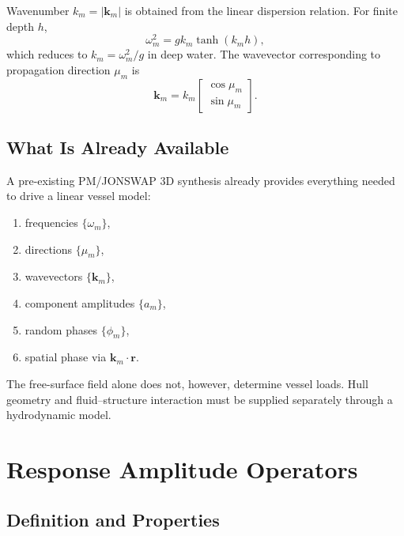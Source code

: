 \documentclass[journal,10pt,twocolumn]{IEEEtran}
\newcommand{\vect}[1]{\bm{#1}}
\begin{document}
    Wavenumber $k_m=|\vect{k}_m|$ is obtained from the linear dispersion relation.
    For finite depth $h$,
    \begin{equation}
        \omega_m^2 = g k_m\tanh(k_m h),
        \label{eq:dispersion}
    \end{equation}
    which reduces to $k_m=\omega_m^2/g$ in deep water.
    The wavevector corresponding to propagation direction $\mu_m$ is
    \begin{equation}
        \vect{k}_m = k_m\begin{bmatrix}\cos\mu_m\\\sin\mu_m\end{bmatrix}.
        \label{eq:wavevec}
    \end{equation}

    \subsection{What Is Already Available}
    \label{sec:available}

    A pre-existing PM/JONSWAP 3D synthesis already provides everything needed to drive a
    linear vessel model:
    \begin{enumerate}[label=(\arabic*),leftmargin=1.4em]
    \item frequencies $\{\omega_m\}$,
    \item directions $\{\mu_m\}$,
    \item wavevectors $\{\vect{k}_m\}$,
    \item component amplitudes $\{a_m\}$,
    \item random phases $\{\phi_m\}$,
    \item spatial phase via $\vect{k}_m\cdot\vect{r}$.
    \end{enumerate}
    The free-surface field alone does not, however, determine vessel loads.
    Hull geometry and fluid--structure interaction must be supplied separately through a
    hydrodynamic model.

    \section{Response Amplitude Operators}
    \label{sec:rao}

    \subsection{Definition and Properties}
    \label{sec:raodef}
\end{document}
